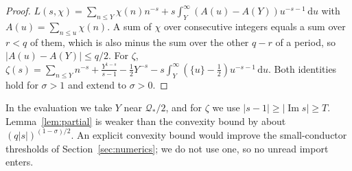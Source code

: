 \documentclass[11pt]{article}
\theoremstyle{definition}
\theoremstyle{remark}
\newcommand{\dd}{\,\mathrm d}
\newcommand{\im}{\operatorname{Im}}
\numberwithin{equation}{section}
\begin{document}
\begin{proof}
$L(s,\chi)=\sum_{n\le Y}\chi(n)n^{-s}+s\int_Y^\infty(A(u)-A(Y))u^{-s-1}\dd u$
with $A(u)=\sum_{n\le u}\chi(n)$. A sum of $\chi$ over consecutive integers
equals a sum over $r<q$ of them, which is also minus the sum over the other
$q-r$ of a period, so $\lvert A(u)-A(Y)\rvert\le q/2$. For $\zeta$,
$\zeta(s)=\sum_{n\le Y}n^{-s}+\frac{Y^{1-s}}{s-1}-\frac12Y^{-s}-s\int_Y^\infty(\{u\}-\frac12)u^{-s-1}\dd u$.
Both identities hold for $\sigma>1$ and extend to $\sigma>0$.
\end{proof}

In the evaluation we take $Y$ near $\mathcal Q_*/2$, and for $\zeta$ we use
$\lvert s-1\rvert\ge\lvert\im s\rvert\ge T$. Lemma~\ref{lem:partial} is
weaker than the convexity bound by about $(q\lvert s\rvert)^{(1-\sigma)/2}$.
An explicit convexity bound would improve the small-conductor thresholds
of Section~\ref{sec:numerics}; we do not use one, so no unread import
enters.
\end{document}
